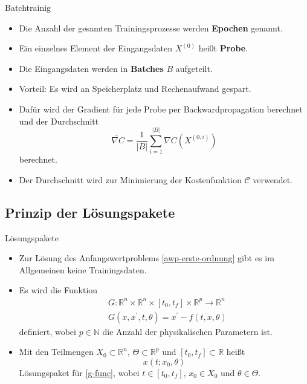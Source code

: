 \begin{frame}{Batchtrainig}
    \begin{itemize}
        \item<1-> Die Anzahl der gesamten Trainingsprozesse werden \textbf{Epochen} genannt.
        \item<2-> Ein einzelnes Element der Eingangsdaten $X^{(0)}$ hei0t \textbf{Probe}.
        \item<3-> Die Eingangsdaten werden in \textbf{Batches} $B$ aufgeteilt.
        \item<4-> Vorteil: Es wird an Speicherplatz und Rechenaufwand gespart.
        \item<5-> Dafür wird der Gradient für jede Probe per Backwardpropagation berechnet und der Durchschnitt
        \[
            \widetilde{\nabla C} = \frac{1}{|B|} \sum_{i=1}^{|B|} \nabla C(X^{(0,i)})
        \]
        berechnet.
        \item<6-> Der Durchschnitt wird zur Minimierung der Kostenfunktion $\mathcal{C}$ verwendet.
    \end{itemize}

\end{frame}

\subsection{Prinzip der Lösungspakete}

\begin{frame}{Lösungspakete}
    \begin{itemize}
        \item<1-> Zur Lösung des Anfangswertproblems \eqref{awp-erste-ordnung} gibt es im Allgemeinen keine Trainingsdaten.
        \item<2-> Es wird die Funktion
        \begin{align}
            \label{g-func}
            &G:\mathbb{R}^n \times \mathbb{R}^n \times [t_0, t_f] \times \mathbb{R}^p \rightarrow \mathbb{R}^n \nonumber\\
            &G \left( x, x^{\prime}, t, \theta \right) = x^{\prime} - f(t, x, \theta)
        \end{align}
        definiert, wobei $p \in \mathbb{N}$ die Anzahl der physikalischen Parametern ist.
        \item<3-> Mit den Teilmengen $X_0 \subset \mathbb{R}^n$, $\Theta \subset \mathbb{R}^p$ und $[t_0,t_f] \subset \mathbb{R}$ heißt
        \[
            x(t;x_0, \theta)
        \]
        Lösungspaket für \eqref{g-func}, wobei $t \in [t_0,t_f]$, $x_0 \in X_0$ und $\theta \in \Theta$.
    \end{itemize}
\end{frame}

